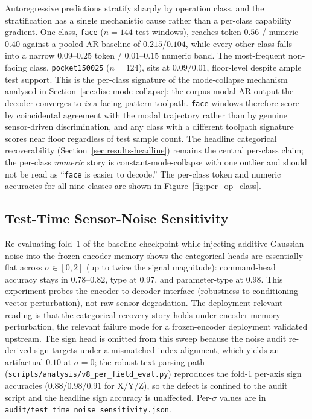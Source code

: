 \documentclass[sensors,article,submit,moreauthors,pdftex]{Definitions/mdpi}
\begin{document}
Autoregressive predictions stratify sharply by operation class, and the stratification has a single mechanistic cause rather than a per-class capability gradient. One class, \texttt{face} ($n=144$ test windows), reaches token $0.56$ / numeric $0.40$ against a pooled AR baseline of $0.215 / 0.104$, while every other class falls into a narrow $0.09$--$0.25$ token / $0.01$--$0.15$ numeric band. The most-frequent non-facing class, \texttt{pocket150025} ($n=124$), sits at $0.09 / 0.01$, floor-level despite ample test support. This is the per-class signature of the mode-collapse mechanism analysed in Section~\ref{sec:disc-mode-collapse}: the corpus-modal AR output the decoder converges to \emph{is} a facing-pattern toolpath. \texttt{face} windows therefore score by coincidental agreement with the modal trajectory rather than by genuine sensor-driven discrimination, and any class with a different toolpath signature scores near floor regardless of test sample count. The headline categorical recoverability (Section~\ref{sec:results-headline}) remains the central per-class claim; the per-class \emph{numeric} story is constant-mode-collapse with one outlier and should not be read as ``\texttt{face} is easier to decode.'' The per-class token and numeric accuracies for all nine classes are shown in Figure~\ref{fig:per_op_class}.


\subsection{Test-Time Sensor-Noise Sensitivity}
\label{sec:noise-sensitivity}

Re-evaluating fold~1 of the baseline checkpoint while injecting additive Gaussian noise into the frozen-encoder memory shows the categorical heads are essentially flat across $\sigma \in [0, 2]$ (up to twice the signal magnitude): command-head accuracy stays in $0.78$--$0.82$, type at $0.97$, and parameter-type at $0.98$. This experiment probes the encoder-to-decoder interface (robustness to conditioning-vector perturbation), not raw-sensor degradation. The deployment-relevant reading is that the categorical-recovery story holds under encoder-memory perturbation, the relevant failure mode for a frozen-encoder deployment validated upstream. The sign head is omitted from this sweep because the noise audit re-derived sign targets under a mismatched index alignment, which yields an artifactual $0.10$ at $\sigma=0$; the robust text-parsing path (\texttt{scripts/analysis/v8\_per\_field\_eval.py}) reproduces the fold-1 per-axis sign accuracies ($0.88$/$0.98$/$0.91$ for X/Y/Z), so the defect is confined to the audit script and the headline sign accuracy is unaffected. Per-$\sigma$ values are in \texttt{audit/test\_time\_noise\_sensitivity.json}.
\end{document}
